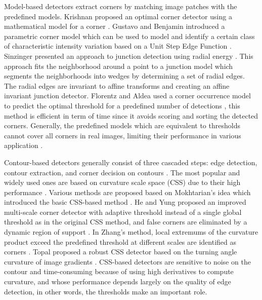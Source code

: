\documentclass[letterpaper, 10 pt, conference]{ieeeconf}  %
\begin{document}
Model-based detectors extract corners by matching image patches with the predefined models. Krishnan proposed an optimal corner detector using a mathematical model for a corner \cite{Brackle1989Optimal}. Gustavo and Benjamin introduced a parametric corner model which can be used to model and identify a certain class of characteristic intensity variation based on a Unit Step Edge Function \cite{Olague2005}. Sinzinger presented an approach to junction detection using radial energy \cite{Sinzinger2008A}. This approach fits the neighborhood around a point to a junction model which segments the neighborhoods into wedges by determining a set of radial edges. The radial edges are invariant to affine transforms and creating an affine invariant junction detector. Florentz and Aldea used a corner occurrence model to predict the optimal threshold for a predefined number of detections \cite{Florentz2014SuperFAST}, this method is efficient in term of time since it avoids scoring and sorting the detected corners. Generally, the predefined models which are equivalent to thresholds cannot cover all corners in real images, limiting their performance in various application \cite{Shui2013}. 

Contour-based detectors generally consist of three cascaded steps: edge detection, contour extraction, and corner decision on contours \cite{Shui2013}. The most popular and widely used ones are based on curvature scale space (CSS) due to their high performance \cite{Kitchen1982Gray}\cite{Kim2012Robust}. Various methods are proposed based on Mokhtarian's idea which introduced the basic CSS-based method \cite{Mokhtarian1992A}. He and Yung proposed an improved multi-scale corner detector with adaptive threshold instead of a single global threshold as in the original CSS method, and false corners are eliminated by a dynamic region of support \cite{He2004Curvature}. In Zhang's method, local extremums of the curvature product exceed the predefined threshold at different scales are identified as corners \cite{Zhang2007Multi}. Topal proposed a robust CSS detector based on the turning angle curvature of image gradients \cite{Topal2013A}. CSS-based detectors are sensitive to noise on the contour and time-consuming because of using high derivatives to compute curvature, and whose performance depends largely on the quality of edge detection, in other words, the thresholds make an important role.
\end{document}
